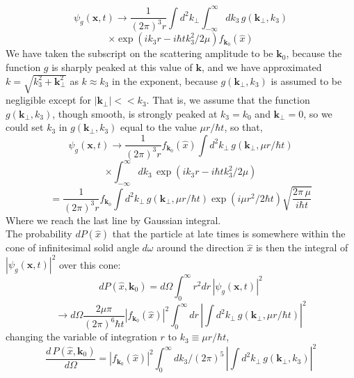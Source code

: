 \documentclass[12pt]{article}
\numberwithin{equation}{section}
\begin{document}
\[\psi_{g}(\mathbf{x}, t)\rightarrow\frac{1}{(2\pi)^3r}\int{d^2k_{\perp}}\int_{-\infty}^{\infty}{dk_3\,g(\mathbf{k}_{\perp}, k_3)}\]
\begin{equation}
    \times\exp(ik_3r-i\hbar tk_3^2/2\mu)f_{\mathbf{k}_0}(\hat{x})
\end{equation}
We have taken the subscript on the scattering amplitude to be $\mathbf{k}_{0}$, because the function $g$ is sharply peaked at this value of $\mathbf{k}$, and we have approximated $k = \sqrt{k_3^2+\mathbf{k}_{\perp}^2}$ as $k\approx k_3$ in the exponent, because $g(\mathbf{k}_{\perp}, k_3)$ is assumed to be negligible except for $|\mathbf{k}_{\perp}|<<k_3$.
That is, we assume that the function $g(\mathbf{k}_{\perp}, k_3)$, though smooth, is strongly peaked at $k_3=k_0$ and $\mathbf{k}_{\perp} = 0$, so we could set $k_3$ in $g(\mathbf{k}_{\perp}, k_3)$ equal to the value $\mu r/\hbar t$, so that,
\[
    \psi_{g}(\mathbf{x}, t)\rightarrow\frac{1}{(2\pi)^3r}f_{\mathbf{k}_0}(\hat{x})\int{d^2k_{\perp}\,g(\mathbf{k}_{\perp}, \mu r/\hbar t)}
\]
\[\times\int_{-\infty}^{\infty}{dk_3\,\exp(ik_3r-i\hbar tk_3^2/2\mu)}\]
\begin{equation}
    =\frac{1}{(2\pi)^3r}f_{\mathbf{k}_0}\int{d^2k_{\perp}\,g(\mathbf{k}_{\perp}, \mu r/\hbar t)\exp(i\mu r^2/2\hbar t)\sqrt{\frac{2\pi\,\mu}{i\hbar t}}}
\end{equation}
Where we reach the last line by Gaussian integral.
\\\indent The probability $dP(\hat{x})$ that the particle at late times is somewhere within the cone of infinitesimal solid angle $d\omega$ around the direction $\hat{x}$ is then the integral of $|\psi_{g}(\mathbf{x}, t)|^2$ over this cone:
\begin{equation}
    dP(\hat{x}, \mathbf{k}_0) = d\Omega\int_{0}^{\infty}{r^2dr\,|\psi_{g}(\mathbf{x}, t)|^2}
\end{equation}
\[\rightarrow d\Omega\frac{2\mu\pi}{(2\pi)^6\hbar t}|f_{\mathbf{k}_0}(\hat{x})|^2\int_{0}^{\infty}{dr\,\left|\int{d^2k_{\perp}\,g(\mathbf{k}_{\perp}, \mu r/\hbar t)}\right|^2}\]
changing the variable of integration $r$ to $k_3\equiv\mu r/\hbar t$,
\begin{equation}
    \frac{d\,P(\hat{x}, \mathbf{k}_0)}{d\Omega} = |f_{\mathbf{k}_0}(\hat{x})|^2\int_{0}^{\infty}{dk_3/(2\pi)^5\,\left|\int{d^2k_{\perp}\,g(\mathbf{k}_{\perp}, k_3)}\right|^2}
\end{equation}
\end{document}
